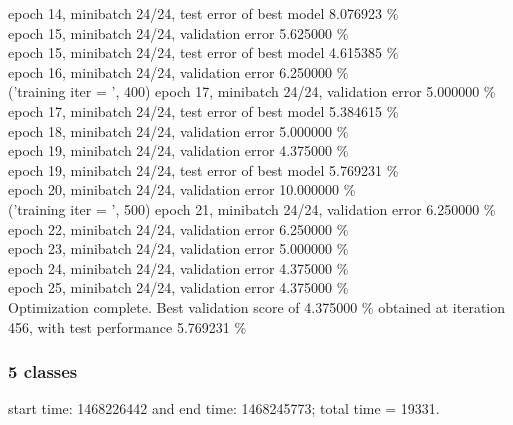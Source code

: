 \documentclass[a4paper]{article}
\begin{document}
     epoch 14, minibatch 24/24, test error of best model 8.076923 \% \\
epoch 15, minibatch 24/24, validation error 5.625000 \% \\
     epoch 15, minibatch 24/24, test error of best model 4.615385 \% \\
epoch 16, minibatch 24/24, validation error 6.250000 \% \\
('training \@ iter = ', 400)
epoch 17, minibatch 24/24, validation error 5.000000 \% \\
     epoch 17, minibatch 24/24, test error of best model 5.384615 \% \\
epoch 18, minibatch 24/24, validation error 5.000000 \% \\
epoch 19, minibatch 24/24, validation error 4.375000 \% \\
     epoch 19, minibatch 24/24, test error of best model 5.769231 \% \\
epoch 20, minibatch 24/24, validation error 10.000000 \% \\
('training \@ iter = ', 500)
epoch 21, minibatch 24/24, validation error 6.250000 \% \\
epoch 22, minibatch 24/24, validation error 6.250000 \% \\
epoch 23, minibatch 24/24, validation error 5.000000 \% \\
epoch 24, minibatch 24/24, validation error 4.375000 \% \\
epoch 25, minibatch 24/24, validation error 4.375000 \% \\
Optimization complete.
Best validation score of 4.375000 \% obtained at iteration 456, with test performance 5.769231 \% \\


\subsubsection{5 classes}
start time: 1468226442 and end time: 1468245773; total time = 19331.\\
\end{document}
